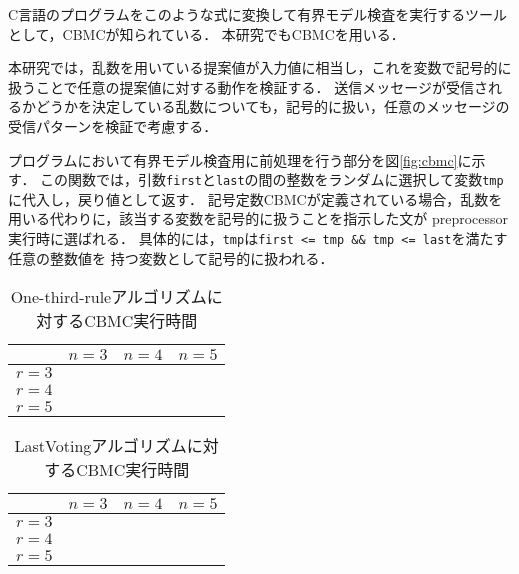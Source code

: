 \documentclass[technicalreport]{ieicej}
\theoremstyle{plain}
\begin{document}
C言語のプログラムをこのような式に変換して有界モデル検査を実行するツールとして，CBMCが知られている\cite{ckl2004}．
本研究でもCBMCを用いる．

本研究では，乱数を用いている提案値が入力値に相当し，これを変数で記号的に扱うことで任意の提案値に対する動作を検証する．
送信メッセージが受信されるかどうかを決定している乱数についても，記号的に扱い，任意のメッセージの受信パターンを検証で考慮する．

プログラムにおいて有界モデル検査用に前処理を行う部分を図\ref{fig:cbmc}に示す．
この関数では，引数\verb|first|と\verb|last|の間の整数をランダムに選択して変数\verb|tmp|に代入し，戻り値として返す．
記号定数CBMCが定義されている場合，乱数を用いる代わりに，該当する変数を記号的に扱うことを指示した文が
preprocessor実行時に選ばれる．
具体的には，\verb|tmp|は\verb|first <= tmp && tmp <= last|を満たす任意の整数値を
持つ変数として記号的に扱われる．

\begin{table}
    \centering
    \caption{One-third-ruleアルゴリズムに対するCBMC実行時間}\label{tab:onethird}
    \begin{tabular}{cccc}
        \hline
                &  $n=3$ & $n = 4$ & $n = 5$ \\ \hline
       $r = 3$ &    &    &     \\ 
       $r = 4$ &    &    &     \\ 
       $r = 5$ &    &    &     \\ 
       
       \hline

    \end{tabular}
\end{table}
\begin{table}
    \centering
    \caption{LastVotingアルゴリズムに対するCBMC実行時間}\label{tab:lastvoting}
    \begin{tabular}{cccc}
        \hline
        &  $n=3$ & $n = 4$ & $n = 5$ \\ \hline
        $r = 3$ &    &    &     \\ 
        $r = 4$ &    &    &     \\ 
        $r = 5$ &    &    &     \\ 
        
        \hline
        
    \end{tabular}
\end{table}
%
\end{document}
